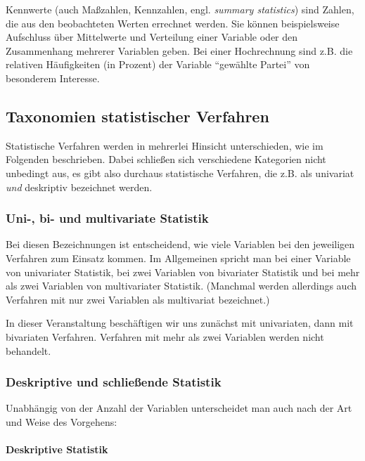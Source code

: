 \documentclass[
  11pt,
  ngerman,
  a4paper,
]{report}
\begin{document}
Kennwerte (auch Maßzahlen, Kennzahlen, engl. \emph{summary statistics}) sind Zahlen, die aus den beobachteten Werten errechnet werden. Sie können beispielsweise Aufschluss über Mittelwerte und Verteilung einer Variable oder den Zusammenhang mehrerer Variablen geben. Bei einer Hochrechnung sind z.B. die relativen Häufigkeiten (in Prozent) der Variable \enquote{gewählte Partei} von besonderem Interesse.

\hypertarget{taxonomien-statistischer-verfahren}{%
\subsection{Taxonomien statistischer Verfahren}\label{taxonomien-statistischer-verfahren}}

Statistische Verfahren werden in mehrerlei Hinsicht unterschieden, wie im Folgenden beschrieben. Dabei schließen sich verschiedene Kategorien nicht unbedingt aus, es gibt also durchaus statistische Verfahren, die z.B. als univariat \emph{und} deskriptiv bezeichnet werden.

\hypertarget{uni--bi--und-multivariate-statistik}{%
\subsubsection{Uni-, bi- und multivariate Statistik}\label{uni--bi--und-multivariate-statistik}}

Bei diesen Bezeichnungen ist entscheidend, wie viele Variablen bei den jeweiligen Verfahren zum Einsatz kommen. Im Allgemeinen spricht man bei einer Variable von univariater Statistik, bei zwei Variablen von bivariater Statistik und bei mehr als zwei Variablen von multivariater Statistik. (Manchmal werden allerdings auch Verfahren mit nur zwei Variablen als multivariat bezeichnet.)

In dieser Veranstaltung beschäftigen wir uns zunächst mit univariaten, dann mit bivariaten Verfahren. Verfahren mit mehr als zwei Variablen werden nicht behandelt.

\hypertarget{deskriptive-und-schlieuxdfende-statistik}{%
\subsubsection{Deskriptive und schließende Statistik}\label{deskriptive-und-schlieuxdfende-statistik}}

Unabhängig von der Anzahl der Variablen unterscheidet man auch nach der Art und Weise des Vorgehens:

\hypertarget{deskriptive-statistik}{%
\paragraph{Deskriptive Statistik}\label{deskriptive-statistik}}
\end{document}
